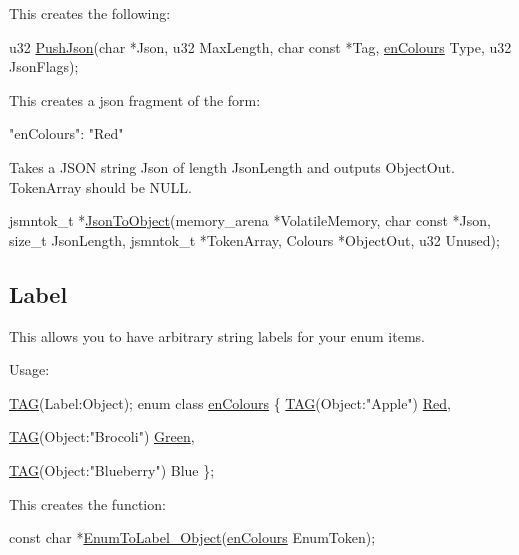 This creates the following\+: 
\begin{DoxyCode}
u32
\hyperlink{Generated__Test_8h_ad8caeb90f89cac9c8978390dc8ec420a}{PushJson}(\textcolor{keywordtype}{char} *Json, u32 MaxLength, \textcolor{keywordtype}{char} \textcolor{keyword}{const} *Tag, \hyperlink{PreprocTest_8h_a081cf1a0e70d6e2bd48c98f457742877}{enColours} Type, u32 JsonFlags);
\end{DoxyCode}
 This creates a json fragment of the form\+: 
\begin{DoxyCode}
"enColours": "Red"
\end{DoxyCode}


Takes a J\+S\+ON string {\ttfamily Json} of length {\ttfamily Json\+Length} and outputs {\ttfamily Object\+Out}. {\ttfamily Token\+Array} should be {\ttfamily N\+U\+LL}. 
\begin{DoxyCode}
jsmntok\_t *\hyperlink{Generated__Test_8h_a64411d75ccfa768d32520dac899352f3}{JsonToObject}(memory\_arena *VolatileMemory, \textcolor{keywordtype}{char} \textcolor{keyword}{const} *Json, \textcolor{keywordtype}{size\_t} JsonLength, 
      jsmntok\_t *TokenArray, Colours *ObjectOut, u32 Unused);
\end{DoxyCode}
\hypertarget{index_autotoc_md11}{}\subsection{Label}\label{index_autotoc_md11}
This allows you to have arbitrary string labels for your enum items.

Usage\+: 
\begin{DoxyCode}
\hyperlink{PreprocTest_8h_a2606cd56d2d8f567785bde5848176722}{TAG}(Label:Object);
\textcolor{keyword}{enum class} \hyperlink{PreprocTest_8h_a081cf1a0e70d6e2bd48c98f457742877}{enColours}
\{
    \hyperlink{PreprocTest_8h_a2606cd56d2d8f567785bde5848176722}{TAG}(Object:\textcolor{stringliteral}{"Apple"})
    \hyperlink{PreprocTest_8h_a081cf1a0e70d6e2bd48c98f457742877aee38e4d5dd68c4e440825018d549cb47}{Red},

    \hyperlink{PreprocTest_8h_a2606cd56d2d8f567785bde5848176722}{TAG}(Object:\textcolor{stringliteral}{"Brocoli"})
    \hyperlink{PreprocTest_8h_a081cf1a0e70d6e2bd48c98f457742877ad382816a3cbeed082c9e216e7392eed1}{Green},

    \hyperlink{PreprocTest_8h_a2606cd56d2d8f567785bde5848176722}{TAG}(Object:\textcolor{stringliteral}{"Blueberry"})
    Blue
\};
\end{DoxyCode}


This creates the function\+: 
\begin{DoxyCode}
\textcolor{keyword}{const} \textcolor{keywordtype}{char} *\hyperlink{Generated__Test_8h_a9b8638e967a81b3c211b77df49d85034}{EnumToLabel\_Object}(\hyperlink{PreprocTest_8h_a081cf1a0e70d6e2bd48c98f457742877}{enColours} EnumToken);
\end{DoxyCode}


